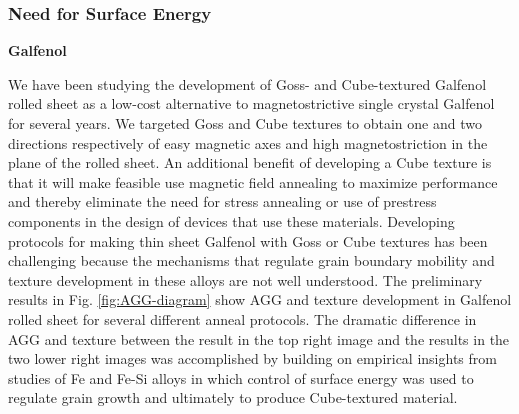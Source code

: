 
\subsubsection{Need for Surface Energy}

\textbf{Galfenol} 

We have been studying the development of Goss- and Cube-textured Galfenol rolled sheet as a low-cost alternative to magnetostrictive single crystal Galfenol for several years. We targeted Goss and Cube textures to obtain one and two directions respectively of easy magnetic axes and high magnetostriction in the plane of the rolled sheet. An additional benefit of developing a Cube texture is that it will make feasible use magnetic field annealing to maximize performance\cite{Yoo2008,Yoo2009} and thereby eliminate the need for stress annealing or use of prestress components in the design of devices that use these materials.\cite{Restorff2006,Summers2009b} Developing protocols for making thin sheet Galfenol with Goss or Cube textures has been challenging because the mechanisms that regulate grain boundary mobility and texture development in these alloys are not well understood. The preliminary results in Fig. \ref{fig:AGG-diagram} show AGG and texture development in Galfenol rolled sheet for several different anneal protocols. The dramatic difference in AGG and texture between the result in the top right image and the results in the two lower right images was accomplished by building on empirical insights from studies of Fe and Fe-Si alloys in which control of surface energy was used to regulate grain growth and ultimately to produce Cube-textured material.\cite{Walter1965,dunn1962surface,waeckerle1993effect,Kramer1992}




